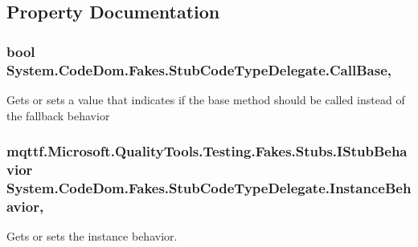 \subsection{Property Documentation}
\hypertarget{class_system_1_1_code_dom_1_1_fakes_1_1_stub_code_type_delegate_a4370d2f57f76a34e8824d34c1316a4d0}{
\subsubsection[{Call\-Base}]{\setlength{\rightskip}{0pt plus 5cm}bool System.\-Code\-Dom.\-Fakes.\-Stub\-Code\-Type\-Delegate.\-Call\-Base\hspace{0.3cm}{\ttfamily [get]}, {\ttfamily [set]}}}\label{class_system_1_1_code_dom_1_1_fakes_1_1_stub_code_type_delegate_a4370d2f57f76a34e8824d34c1316a4d0}


Gets or sets a value that indicates if the base method should be called instead of the fallback behavior

\hypertarget{class_system_1_1_code_dom_1_1_fakes_1_1_stub_code_type_delegate_a6db5f59fc2e9ba84e0c86241d4c31b9d}{
\subsubsection[{Instance\-Behavior}]{\setlength{\rightskip}{0pt plus 5cm}mqttf.\-Microsoft.\-Quality\-Tools.\-Testing.\-Fakes.\-Stubs.\-I\-Stub\-Behavior System.\-Code\-Dom.\-Fakes.\-Stub\-Code\-Type\-Delegate.\-Instance\-Behavior\hspace{0.3cm}{\ttfamily [get]}, {\ttfamily [set]}}}\label{class_system_1_1_code_dom_1_1_fakes_1_1_stub_code_type_delegate_a6db5f59fc2e9ba84e0c86241d4c31b9d}


Gets or sets the instance behavior.

